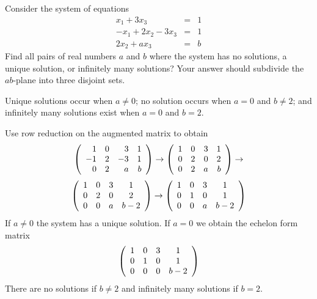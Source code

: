 \documentclass{article}
\begin{document}
\begin{exercise}\label{c2.4.2b.2}

Consider the system of equations
\[
\begin{array}{rcl}
x_1 + 3x_3 & = & 1 \\
-x_1+2x_2-3x_3 & = & 1\\
2x_2 + ax_3 & = & b
\end{array}
\]
Find all pairs of real numbers $a$ and $b$ where the system has no solutions, a unique solution, or infinitely many solutions?  Your answer should subdivide the $ab$-plane into three disjoint sets.
  
\begin{solution}

\ans Unique solutions occur when $a\neq 0$; no solution occurs when $a=0$ and $b\neq 2$; and infinitely many solutions exist when $a = 0$ and $b =2$.

\soln 
Use row reduction on the augmented matrix to obtain
\[
\left(\begin{array}{rrrrrrrrrrrrrrrrrr} 1 & 0 & 3 & 1\\ -1 & 2 & -3 & 1 \\ 0 & 2 & a & b \end{array}\right) \to
\left(\begin{array}{rrrrrrrrrrrrrrrrrr} 1 & 0 & 3 & 1\\  0 & 2 & 0 & 2 \\ 0 & 2 & a & b \end{array}\right) \to
\]
\[
\left(\begin{array}{cccccccccccc} 1 & 0 & 3 & 1\\  0 & 2 & 0 & 2 \\ 0 & 0 & a & b - 2 \end{array}\right) \to
\left(\begin{array}{cccccccccccc} 1 & 0 & 3 & 1\\  0 & 1 & 0 & 1 \\ 0 & 0 & a & b - 2 \end{array}\right) 
\]
If $a\neq 0$ the system has a unique solution. If $a = 0$ we obtain the echelon form matrix
\[
\left(\begin{array}{cccccccccccc} 1 & 0 & 3 & 1\\  0 & 1 & 0 & 1 \\ 0 & 0 & 0 & b - 2 \end{array}\right)
\]  
There are no solutions if $b\neq 2$ and infinitely many solutions if $b = 2$.

\end{solution}
\end{exercise}





\problemlabel
\end{document}
